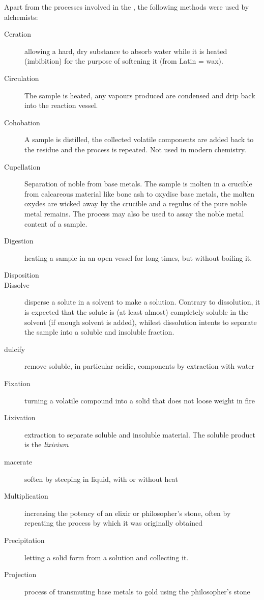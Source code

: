 \documentclass[british,final,landscape]{scrartcl}
\begin{document}
\begin{refsection}
Apart from the processes involved in the , the following methods were used by alchemists:
\begin{description}
  \item[Ceration]{allowing a hard, dry substance to absorb water while it is heated (imbibition) for the purpose of softening it (from Latin  = wax). }
  \item[Circulation]{The sample is heated, any vapours produced are condensed and drip back into the reaction vessel. }
  \item[Cohobation]{A sample is distilled, the collected volatile components are added back to the residue and the process is repeated. Not used in modern chemistry.}
  \item[Cupellation]{Separation of noble from base metals. The sample is molten in a crucible from calcareous material like bone ash to oxydise base metals, the molten oxydes are wicked away by the crucible and a regulus of the pure noble metal remains. The process may also be used to assay the noble metal content of a sample.}
  \item[Digestion]{heating a sample in an open vessel for long times, but without boiling it.}
  \item[Disposition]{}
  \item[Dissolve]{disperse a solute in a solvent to make a solution. Contrary to dissolution, it is expected that the solute is (at least almost) completely soluble in the solvent (if enough solvent is added), whilest dissolution intents to separate the sample into a soluble and insoluble fraction. }
  \item[dulcify]{remove soluble, in particular acidic, components by extraction with water }
  \item[Fixation]{turning a volatile compound into a solid that does not loose weight in fire}
  \item[Lixivation]{extraction to separate soluble and insoluble material. The soluble product is the \emph{lixivium} }
  \item[macerate]{soften by steeping in liquid, with or without heat }
  \item[Multiplication]{increasing the potency of an elixir or philosopher's stone, often by repeating the process by which it was originally obtained}
  \item[Precipitation]{letting a solid form from a solution and collecting it. }
  \item[Projection]{process of transmuting base metals to gold using the philosopher's stone}

\end{description}
\end{refsection}
\end{document}
